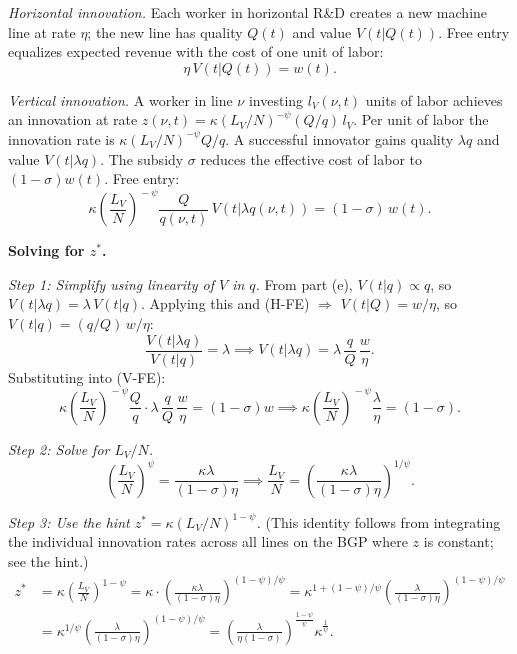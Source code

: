 \documentclass[11pt]{exam}
\begin{document}
\begin{questions}
\begin{solution}
\textit{Horizontal innovation.}  Each worker in horizontal R\&D creates a new machine line at rate $\eta$; the new line has quality $Q(t)$ and value $V(t|Q(t))$.  Free entry equalizes expected revenue with the cost of one unit of labor:
\begin{equation}\tag{H-FE}
	\eta\,V(t|Q(t)) = w(t).
\end{equation}

\textit{Vertical innovation.}  A worker in line $\nu$ investing $l_{V}(\nu,t)$ units of labor achieves an innovation at rate $z(\nu,t)=\kappa(L_{V}/N)^{-\psi}(Q/q)\,l_{V}$.  Per unit of labor the innovation rate is $\kappa(L_{V}/N)^{-\psi}Q/q$.  A successful innovator gains quality $\lambda q$ and value $V(t|\lambda q)$.  The subsidy $\sigma$ reduces the effective cost of labor to $(1-\sigma)w(t)$.  Free entry:
\begin{equation}\tag{V-FE}
	\kappa\!\left(\frac{L_{V}}{N}\right)^{\!-\psi}\frac{Q}{q(\nu,t)}\,V(t|\lambda q(\nu,t)) = (1-\sigma)\,w(t).
\end{equation}

\textbf{Solving for $z^{*}$.}

\textit{Step 1: Simplify using linearity of $V$ in $q$.}  From part (e), $V(t|q)\propto q$, so $V(t|\lambda q)=\lambda\,V(t|q)$.  Applying this and (H-FE) $\Rightarrow$ $V(t|Q)=w/\eta$, so $V(t|q)=(q/Q)\,w/\eta$:
\[
	\frac{V(t|\lambda q)}{V(t|q)} = \lambda \implies V(t|\lambda q) = \lambda\,\frac{q}{Q}\,\frac{w}{\eta}.
\]
Substituting into (V-FE):
\[
	\kappa\!\left(\frac{L_{V}}{N}\right)^{\!-\psi}\frac{Q}{q}\cdot\lambda\,\frac{q}{Q}\,\frac{w}{\eta} = (1-\sigma)w
	\implies \kappa\!\left(\frac{L_{V}}{N}\right)^{\!-\psi}\frac{\lambda}{\eta} = (1-\sigma).
\]

\textit{Step 2: Solve for $L_{V}/N$.}
\[
	\left(\frac{L_{V}}{N}\right)^{\!\psi} = \frac{\kappa\lambda}{(1-\sigma)\eta}
	\implies \frac{L_{V}}{N} = \left(\frac{\kappa\lambda}{(1-\sigma)\eta}\right)^{\!1/\psi}.
\]

\textit{Step 3: Use the hint $z^{*}=\kappa(L_{V}/N)^{1-\psi}$.}  (This identity follows from integrating the individual innovation rates across all lines on the BGP where $z$ is constant; see the hint.)
\begin{align*}
	z^{*} &= \kappa\!\left(\frac{L_{V}}{N}\right)^{\!1-\psi}
	= \kappa\cdot\left(\frac{\kappa\lambda}{(1-\sigma)\eta}\right)^{\!(1-\psi)/\psi}
	= \kappa^{1+(1-\psi)/\psi}\left(\frac{\lambda}{(1-\sigma)\eta}\right)^{\!(1-\psi)/\psi} \\[4pt]
	&= \kappa^{1/\psi}\left(\frac{\lambda}{(1-\sigma)\eta}\right)^{\!(1-\psi)/\psi}
	= \boxed{\left(\frac{\lambda}{\eta(1-\sigma)}\right)^{\!\frac{1-\psi}{\psi}}\kappa^{\frac{1}{\psi}}.}
\end{align*}
\end{solution}


\end{questions}
\end{document}

